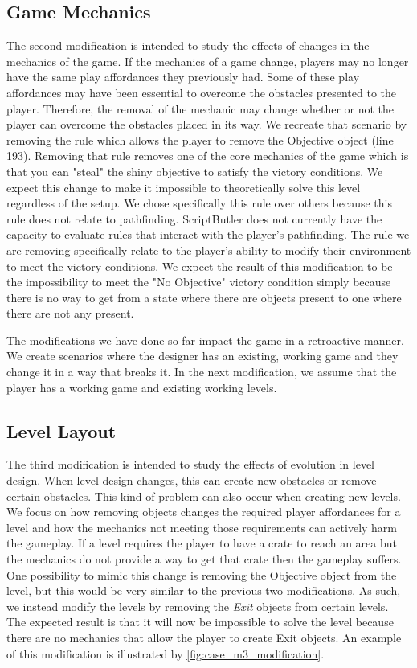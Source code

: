 \subsection{Game Mechanics}
The second modification is intended to study the effects of changes in the mechanics of the game. If the mechanics of a game change, players may no longer have the same play affordances they previously had. Some of these play affordances may have been essential to overcome the obstacles presented to the player. Therefore, the removal of the mechanic may change whether or not the player can overcome the obstacles placed in its way. We recreate that scenario by removing the rule which allows the player to remove the Objective object (line 193). Removing that rule removes one of the core mechanics of the game which is that you can "steal" the shiny objective to satisfy the victory conditions. We expect this change to make it impossible to theoretically solve this level regardless of the setup. We chose specifically this rule over others because this rule does not relate to pathfinding. ScriptButler does not currently have the capacity to evaluate rules that interact with the player's pathfinding. The rule we are removing specifically relate to the player's ability to modify their environment to meet the victory conditions. We expect the result of this modification to be the impossibility to meet the "No Objective" victory condition simply because there is no way to get from a state where there are objects present to one where there are not any present.

The modifications we have done so far impact the game in a retroactive manner. We create scenarios where the designer has an existing, working game and they change it in a way that breaks it. In the next modification, we assume that the player has a working game and existing working levels.

\subsection{Level Layout}
The third modification is intended to study the effects of evolution in level design. When level design changes, this can create new obstacles or remove certain obstacles. This kind of problem can also occur when creating new levels. We focus on how removing objects changes the required player affordances for a level and how the mechanics not meeting those requirements can actively harm the gameplay. If a level requires the player to have a crate to reach an area but the mechanics do not provide a way to get that crate then the gameplay suffers. One possibility to mimic this change is removing the Objective object from the level, but this would be very similar to the previous two modifications. As such, we instead modify the levels by removing the \emph{Exit} objects from certain levels. The expected result is that it will now be impossible to solve the level because there are no mechanics that allow the player to create Exit objects. An example of this modification is illustrated by \ref{fig:case_m3_modification}.

